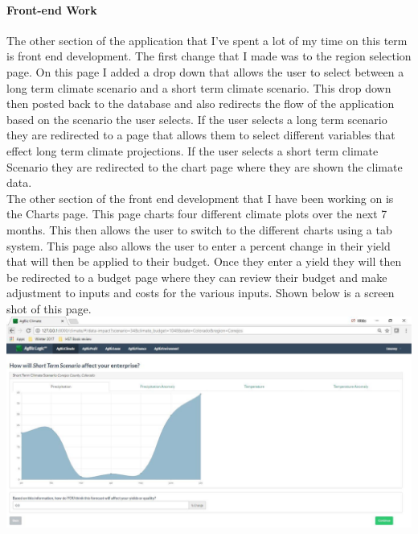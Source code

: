 \documentclass[onecolumn, draftclsnofoot,10pt, compsoc]{article}
\begin{document}
		\paragraph{Front-end Work} \hfill \break
		The other section of the application that I've spent a lot of my time on this term is front end development. The first change that I made was to the region selection page. On this page I added a drop down that allows the user to select between a long term climate scenario and a short term climate scenario. This drop down then posted back to the database and also redirects the flow of the application based on the scenario the user selects. If the user selects a long term scenario they are redirected to a page that allows them to select different variables that effect long term climate projections. If the user selects a short term climate Scenario they are redirected to the chart page where they are shown the climate data.\\
		
		The other section of the front end development that I have been working on is the Charts page. This page charts four different climate plots over the next 7 months. This then allows the user to switch to the different charts using a tab system. This page also allows the user to enter a percent change in their yield that will then be applied to their budget. Once they enter a yield they will then be redirected to a budget page where they can review their budget and make adjustment to inputs and costs for the various inputs. Shown below is a screen shot of this page.\\
		
		\includegraphics{chartsPage.eps}
		
\end{document}
